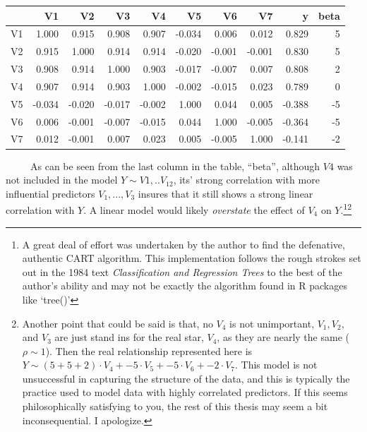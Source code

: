 \documentclass[12pt,twoside]{reedthesis}
\begin{document}
  \begin{tabular}{l|r|r|r|r|r|r|r|r|r}
  \hline
    & V1 & V2 & V3 & V4 & V5 & V6 & V7 & y & beta\\
  \hline
  V1 & 1.000 & 0.915 & 0.908 & 0.907 & -0.034 & 0.006 & 0.012 & 0.829 & 5\\
  \hline
  V2 & 0.915 & 1.000 & 0.914 & 0.914 & -0.020 & -0.001 & -0.001 & 0.830 & 5\\
  \hline
  V3 & 0.908 & 0.914 & 1.000 & 0.903 & -0.017 & -0.007 & 0.007 & 0.808 & 2\\
  \hline
  V4 & 0.907 & 0.914 & 0.903 & 1.000 & -0.002 & -0.015 & 0.023 & 0.789 & 0\\
  \hline
  V5 & -0.034 & -0.020 & -0.017 & -0.002 & 1.000 & 0.044 & 0.005 & -0.388 & -5\\
  \hline
  V6 & 0.006 & -0.001 & -0.007 & -0.015 & 0.044 & 1.000 & -0.005 & -0.364 & -5\\
  \hline
  V7 & 0.012 & -0.001 & 0.007 & 0.023 & 0.005 & -0.005 & 1.000 & -0.141 & -2\\
  \hline
  \end{tabular}
  
  ~~~~~As can be seen from the last column in the table, ``beta'',
  although \(V4\) was not included in the model \(Y \sim V1,..V_{12}\),
  its' strong correlation with more influential predictors \(V_1,...,V_3\)
  insures that it still shows a strong linear correlation with \(Y\). A
  linear model would likely \emph{overstate} the effect of \(V_4\) on
  \(Y\).\footnote{A great deal of effort was undertaken by the author to
    find the defenative, authentic CART algorithm. This implementation
    follows the rough strokes set out in the 1984 text
    \emph{Classification and Regression Trees} to the best of the author's
    ability and may not be exactly the algorithm found in R packages like
    `tree()'}\footnote{Another point that could be said is that, no
    \(V_4\) is not unimportant, \(V_1, V_2,\) and \(V_3\) are just stand
    ins for the real star, \(V_4\), as they are nearly the same
    (\(\rho \sim 1\)). Then the real relationship represented here is
    \(Y \sim (5 + 5 + 2) \cdot V_4 + -5 \cdot V_5 + -5 \cdot V_6 + -2 \cdot V_7\).
    This model is not unsuccessful in capturing the structure of the data,
    and this is typically the practice used to model data with highly
    correlated predictors. If this seems philosophically satisfying to
    you, the rest of this thesis may seem a bit inconsequential. I
    apologize.}
  
\end{document}

